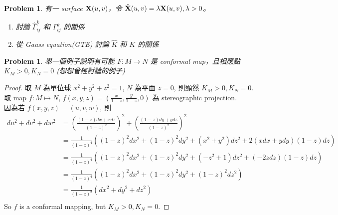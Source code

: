 \documentclass[10pt,a4paper]{article}
\newcounter{theProblemCounter}
\newtheorem{problem}[theProblemCounter]{Problem}
\begin{document}
\setcounter{theProblemCounter}{5}
\begin{problem}
有一 surface $\mathbf{X}(u, v)$，令 $\hat{\mathbf{X}}(u, v)=\lambda \mathbf{X}(u,v), \lambda > 0$。
\begin{enumerate}
\item[(a)] 討論 $\hat{\Gamma}^k_{ij}$ 和 $\Gamma^k_{ij}$ 的關係
\item[(b)] 從 Gauss equation(GTE) 討論 $\hat{K}$ 和 $K$ 的關係
\end{enumerate}
\end{problem}

\setcounter{theProblemCounter}{8}
\begin{problem}
舉一個例子說明有可能 $F:M\to N$ 是 conformal map，且相應點 $K_M>0, K_N=0$ (想想曾經討論的例子)
\end{problem}
\begin{proof}
取 $M$ 為單位球 $x^2+y^2+z^2=1$, $N$ 為平面 $z=0$, 則顯然 $K_M>0, K_N=0$.\\
取 map $f: M\mapsto N$, $f(x,y,z)=(\frac{x}{1-z},\frac{y}{1-z},0)$ 為 stereographic projection.\\
因為若 $f(x,y,z)=(u,v,w)$, 則
\begin{align*}
du^2+dv^2+dw^2&=\left(\frac{(1-z)dx+x dz}{(1-z)^2}\right)^2+\left(\frac{(1-z)dy+y dz}{(1-z)^2}\right)^2\\
&=\frac{1}{(1-z)^4}\left((1-z)^2dx^2+(1-z)^2dy^2+(x^2+y^2)dz^2+2(xdx+ydy)(1-z)dz\right)\\
&=\frac{1}{(1-z)^4}\left((1-z)^2dx^2+(1-z)^2dy^2+(-z^2+1)dz^2+(-2zdz)(1-z)dz\right)\\
&=\frac{1}{(1-z)^4}\left((1-z)^2dx^2+(1-z)^2dy^2+(1-z)^2dz^2\right)\\
&=\frac{1}{(1-z)^2}\left(dx^2+dy^2+dz^2\right)\\
\end{align*}
So $f$ is a conformal mapping, but $K_M>0, K_N=0$.
\end{proof}
\end{document}

